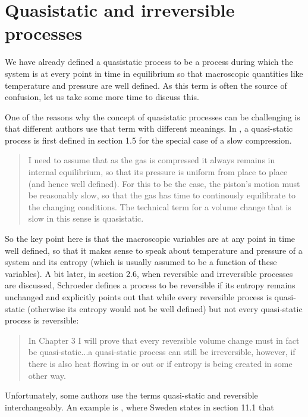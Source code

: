 \documentclass[a4paper, draft]{report}
\numberwithin{section}{chapter}
\numberwithin{equation}{chapter}
\theoremstyle{own}
\theoremstyle{remark}
\begin{document}
\section{Quasistatic and irreversible processes}

We have already defined a quasistatic process to be a process during which the system is at every point in time in equilibrium so that macroscopic quantities like temperature and pressure are well defined. As this term is often the source of confusion, let us take some more time to discuss this.

One of the reasons why the concept of quasistatic processes can be challenging is that different authors use that term with different meanings. In \cite{Schroeder}, a quasi-static process is first defined in section 1.5 for the special case of a slow compression.

\begin{quote}
I need to assume that as the gas is compressed it always remains in internal equilibrium, so that its pressure is uniform from place to place (and hence well defined). For this to be the case, the piston's motion must be reasonably slow, so that the gas has time to continously equilibrate to the changing conditions. The technical term for a volume change that is slow in this sense is quasistatic.
\end{quote}

So the key point here is that the macroscopic variables are at any point in time well defined, so that it makes sense to speak about temperature and pressure of a system and its entropy (which is usually assumed to be a function of these variables). A bit later, in section 2.6, when reversible and irreversible processes are discussed, Schroeder defines a process to be reversible if its entropy remains unchanged and explicitly points out that while every reversible process is quasi-static (otherwise its entropy would not be well defined) but not every quasi-static process is reversible:

\begin{quote}
	In Chapter 3 I will prove that every reversible volume change must in fact be quasi-static...a quasi-static process can still be irreversible, however, if there is also heat flowing in or out or if  entropy is being created in some other way.
\end{quote}

Unfortunately, some authors use the terms quasi-static and reversible interchangeably. An example is \cite{Sweden}, where Sweden states in section 11.1 that
\end{document}
